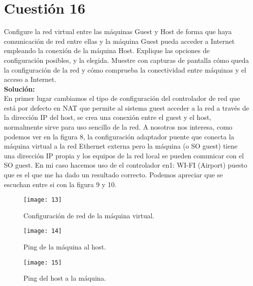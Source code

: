 \documentclass[a4paper, 11pt]{article} %
\begin{document}
\section{Cuestión 16}
Configure la red virtual entre las máquinas Guest y Host de forma que haya comunicación de red entre ellas y la máquina Guest pueda acceder a Internet empleando la conexión de la máquina Host. Explique las opciones de configuración posibles, y la elegida. Muestre con capturas de pantalla cómo queda la configuración de la red y cómo comprueba la conectividad entre máquinas y el acceso a Internet.\\
\textbf{Solución:}\\

En primer lugar cambiamos el tipo de configuración del controlador de red que está por defecto en NAT que permite al sistema guest acceder a la red a través de la dirección IP del host, se crea una conexión entre el guest y el host, normalmente sirve para uso sencillo de la red. A nosotros nos interesa, como podemos ver en la figura 8, la configuración adaptador puente que conecta la máquina virtual a la red Ethernet externa pero la máquina (o SO guest) tiene una dirección IP propia y los equipos de la red local se pueden comunicar con el SO guest. En mi caso hacemos uso de el controlador en1: WI-FI (Airport) puesto que es el que me ha dado un resultado correcto. Podemos apreciar que se escuchan entre si con la figura 9 y 10.

\begin{figure}[h]
\centering 
\texttt{[image: 13]} 
\caption{Configuración de red de la máquina virtual.}
\vspace{-0.2cm} 
\label{contexto:figura} 
\end{figure}
\begin{figure}[h]
\centering 
\texttt{[image: 14]} 
\caption{Ping de la máquina al host.}
\vspace{-0.2cm} 
\label{contexto:figura} 
\end{figure}
\begin{figure}[h]
\centering 
\texttt{[image: 15]} 
\caption{Ping del host a la máquina.}
\vspace{-0.2cm} 
\label{contexto:figura} 
\end{figure}
\end{document}
